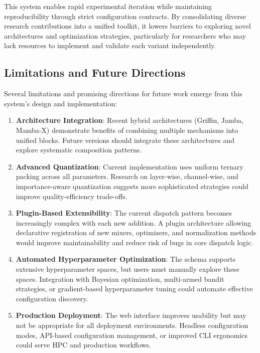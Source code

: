 This system enables rapid experimental iteration while maintaining reproducibility through strict configuration contracts. By consolidating diverse research contributions into a unified toolkit, it lowers barriers to exploring novel architectures and optimization strategies, particularly for researchers who may lack resources to implement and validate each variant independently.

\subsection{Limitations and Future Directions}

Several limitations and promising directions for future work emerge from this system's design and implementation:

\begin{enumerate}[leftmargin=*]
    \item \textbf{Architecture Integration}: Recent hybrid architectures (Griffin, Jamba, Mamba-X) demonstrate benefits of combining multiple mechanisms into unified blocks. Future versions should integrate these architectures and explore systematic composition patterns.
    
    \item \textbf{Advanced Quantization}: Current implementation uses uniform ternary packing across all parameters. Research on layer-wise, channel-wise, and importance-aware quantization suggests more sophisticated strategies could improve quality-efficiency trade-offs.
    
    \item \textbf{Plugin-Based Extensibility}: The current dispatch pattern becomes increasingly complex with each new addition. A plugin architecture allowing declarative registration of new mixers, optimizers, and normalization methods would improve maintainability and reduce risk of bugs in core dispatch logic.
    
    \item \textbf{Automated Hyperparameter Optimization}: The schema supports extensive hyperparameter spaces, but users must manually explore these spaces. Integration with Bayesian optimization, multi-armed bandit strategies, or gradient-based hyperparameter tuning could automate effective configuration discovery.
    
    \item \textbf{Production Deployment}: The web interface improves usability but may not be appropriate for all deployment environments. Headless configuration modes, API-based configuration management, or improved CLI ergonomics could serve HPC and production workflows.
    

\end{enumerate}
